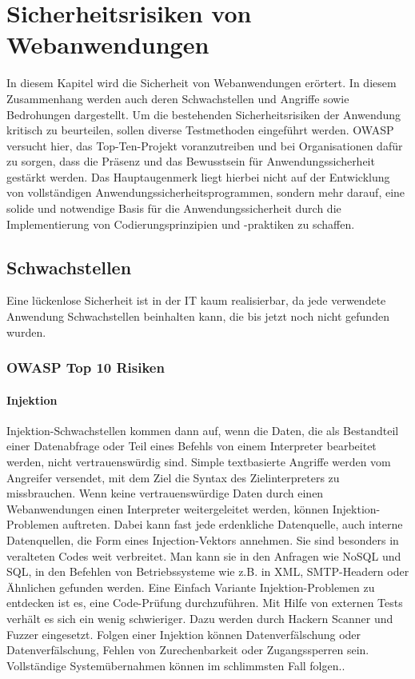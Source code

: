\chapter{Sicherheitsrisiken von Webanwendungen}
\label{cha:k3}

In diesem Kapitel wird die Sicherheit von Webanwendungen erörtert. In diesem Zusammenhang werden auch deren Schwachstellen und Angriffe sowie Bedrohungen dargestellt. Um die bestehenden Sicherheitsrisiken der Anwendung kritisch zu beurteilen, sollen diverse Testmethoden eingeführt werden. OWASP versucht hier, das Top-Ten-Projekt voranzutreiben und bei Organisationen dafür zu sorgen, dass die Präsenz und das Bewusstsein für Anwendungssicherheit gestärkt werden. Das Hauptaugenmerk liegt hierbei nicht auf der Entwicklung von vollständigen Anwendungssicherheitsprogrammen, sondern mehr darauf, eine solide und notwendige Basis für die Anwendungssicherheit durch die Implementierung von Codierungsprinzipien und -praktiken zu schaffen.

\section{Schwachstellen}

Eine lückenlose Sicherheit ist in der IT kaum realisierbar, da jede verwendete Anwendung Schwachstellen beinhalten kann, die bis jetzt noch nicht gefunden wurden.

\subsection{OWASP Top 10 Risiken}

\subsubsection{Injektion}

Injektion-Schwachstellen kommen dann auf, wenn die Daten, die als Bestandteil einer Datenabfrage oder Teil eines Befehls von einem Interpreter bearbeitet werden, nicht vertrauenswürdig sind. Simple textbasierte Angriffe werden vom Angreifer versendet, mit dem Ziel die Syntax des Zielinterpreters zu missbrauchen. Wenn keine vertrauenswürdige Daten durch einen Webanwendungen einen Interpreter weitergeleitet werden, können Injektion-Problemen auftreten. Dabei kann fast jede erdenkliche Datenquelle, auch interne Datenquellen, die Form eines Injection-Vektors annehmen. Sie sind besonders in veralteten Codes weit verbreitet. Man kann sie in den Anfragen wie NoSQL und SQL, in den Befehlen von Betriebssysteme wie z.B. in XML, SMTP-Headern oder Ähnlichen gefunden werden. Eine Einfach Variante Injektion-Problemen zu entdecken ist es, eine Code-Prüfung durchzuführen. Mit Hilfe von externen Tests verhält es sich ein wenig schwieriger. Dazu werden durch Hackern Scanner und Fuzzer eingesetzt. Folgen einer Injektion können Datenverfälschung oder Datenverfälschung, Fehlen von Zurechenbarkeit oder Zugangssperren sein. Vollständige Systemübernahmen können im schlimmsten Fall folgen.\cite{owasp13top10}.\\

